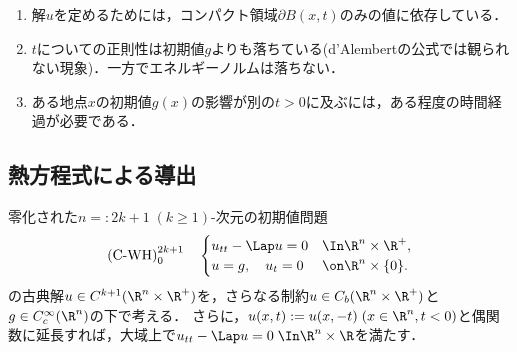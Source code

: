 \documentclass[uplatex,dvipdfmx]{jsreport}
\begin{document}
\begin{remarks}\mbox{}
    \begin{enumerate}
        \item 解$u$を定めるためには，コンパクト領域$\partial B(x,t)$のみの値に依存している．
        \item $t$についての正則性は初期値$g$よりも落ちている(d'Alembertの公式では観られない現象)．一方でエネルギーノルムは落ちない．
        \item ある地点$x$の初期値$g(x)$の影響が別の$t>0$に及ぶには，ある程度の時間経過が必要である．
    \end{enumerate}
\end{remarks}

\subsection{熱方程式による導出}

\begin{problem}
    零化された$n=:2k+1\;(k\ge1)$-次元の初期値問題
    \[\text{(C-WH)}^{2k+1}_0\quad\begin{cases}
        u_{tt}-\Lap u=0&\In\R^n\times\R^+,\\
        u=g,\quad u_t=0&\on\R^n\times\{0\}.
    \end{cases}\]
    の古典解$u\in C^{k+1}(\R^n\times\R^+)$を，さらなる制約$u\in C_b(\R^n\times\R^+)$と$g\in C_c^\infty(\R^n)$の下で考える．
    さらに，$u(x,t):=u(x,-t)\;(x\in\R^n,t<0)$と偶関数に延長すれば，大域上で$u_{tt}-\Lap u=0\;\In\R^n\times\R$を満たす．
\end{problem}
\end{document}
